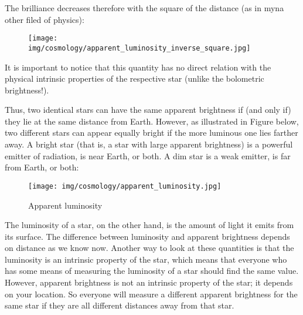 	The brilliance decreases therefore with the square of the distance (as in myna other filed of physics):
	\begin{figure}[H]
		\centering
		\texttt{[image: img/cosmology/apparent\_luminosity\_inverse\_square.jpg]}
	\end{figure}
	It is important to notice that this quantity has no direct relation with the physical intrinsic  properties of the respective star (unlike the bolometric brightness!).
	
	Thus, two identical stars can have the same apparent brightness if (and only if) they lie at the same distance from Earth. However, as illustrated in Figure below, two different stars can appear equally bright if the more luminous one lies farther away. A bright star (that is, a star with large apparent brightness) is a powerful emitter of radiation, is near Earth, or both. A dim star is a weak emitter, is far from Earth, or both:
	\begin{figure}[H]
		\centering
		\texttt{[image: img/cosmology/apparent\_luminosity.jpg]}	
		\caption{Apparent luminosity}
	\end{figure}	
	 The luminosity of a star, on the other hand, is the amount of light it emits from its surface. The difference between luminosity and apparent brightness depends on distance as we know now. Another way to look at these quantities is that the luminosity is an intrinsic property of the star, which means that everyone who has some means of measuring the luminosity of a star should find the same value. However, apparent brightness is not an intrinsic property of the star; it depends on your location. So everyone will measure a different apparent brightness for the same star if they are all different distances away from that star.
	
